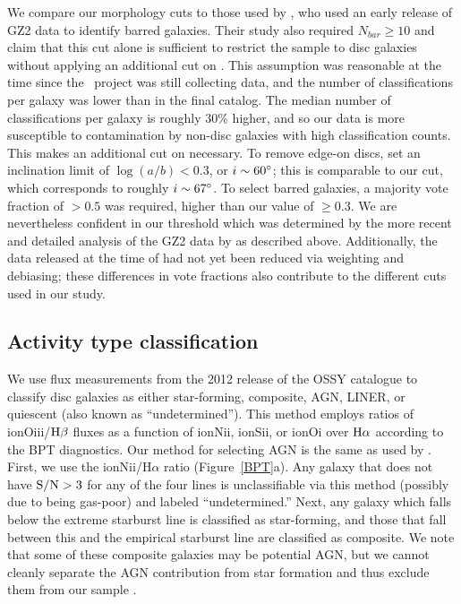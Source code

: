 We compare our morphology cuts to those used by \citet{Masters11}, who used an early release of GZ2 data to identify barred galaxies. Their study also required $N_{bar}\ge10$ and claim that this cut alone is sufficient to restrict the sample to disc galaxies without applying an additional cut on \pfeatures. This assumption was reasonable at the time since the \gztwo~project was still collecting data, and the number of classifications per galaxy was lower than in the final catalog. The median number of classifications per galaxy is roughly 30\% higher, and so our data is more susceptible to contamination by non-disc galaxies with high classification counts. This makes an additional cut on \pfeatures necessary. To remove edge-on discs, \citet{Masters11} set an inclination limit of $\log(a/b)<0.3$, or $i\sim60\mbox{$^\circ$}$; this is comparable to our \pnotedgeon cut, which corresponds to roughly $i\sim67\mbox{$^\circ$}$. To select barred galaxies, a majority vote fraction of \pbar$>0.5$ was required, higher than our value of \pbar$\ge0.3$. We are nevertheless confident in our threshold which was determined by the more recent and detailed analysis of the GZ2 data by \citet{Kyle} as described above. Additionally, the data released at the time of \citet{Masters11} had not yet been reduced via weighting and debiasing; these differences in vote fractions also contribute to the different cuts used in our study.
 
\subsection{Activity type classification}
\label{sec:Activity}
We use flux measurements from the 2012 release of the OSSY catalogue \citep{OSSY} to classify disc galaxies as either star-forming, composite, AGN, LINER, or quiescent (also known as ``undetermined''). This method employs ratios of ion{O}{iii}/$\rm H\beta$ fluxes as a function of ion{N}{ii}, ion{S}{ii}, or ion{O}{i} over $\rm H\alpha$ according to the BPT diagnostics. Our method for selecting AGN is the same as used by \citet{Ski07,Ski10}. First, we use the ion{N}{ii}/H$\alpha$ ratio (Figure~\ref{BPT}a). Any galaxy that does not have $\rm S/N>3$ for any of the four lines is unclassifiable via this method (possibly due to being gas-poor) and labeled ``undetermined.'' Next, any galaxy which falls below the \citet{Kewley01} extreme starburst line is classified as star-forming, and those that fall between this and the \citet{Kauffmann03a} empirical starburst line are classified as composite. We note that some of these composite galaxies may be potential AGN, but we cannot cleanly separate the AGN contribution from star formation and thus exclude them from our sample \citep{Ski10}. 

